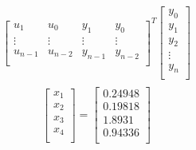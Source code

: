 \documentclass[12pt,letterpaper, onecolumn]{exam}
\begin{document}
\begin{questions}
\begin{parts}
\begin{subparts}
{\begin{equation}
\begin{split}
\begin{bmatrix}
                            u_{1}   & u_{0}   & y_{1}   & y_{0}   \\
                            \vdots  & \vdots  & \vdots  & \vdots  \\
                            u_{n-1} & u_{n-2} & y_{n-1} & y_{n-2} \\
                        \end{bmatrix}^T \begin{bmatrix}
                            y_0    \\
                            y_1    \\
                            y_2    \\
                            \vdots \\
                            y_n    \\
                        \end{bmatrix}\\
                    \end{split}
                    \label{}
                \end{equation}
                \begin{equation}
                    \begin{bmatrix}
                        x_1 \\
                        x_2 \\
                        x_3 \\
                        x_4 \\
                    \end{bmatrix}  =
                    \begin{bmatrix}
                        0.24948 \\
                        0.19818 \\
                        1.8931  \\
                        0.94336 \\
                    \end{bmatrix}
                \end{equation}
            }
            \clearpage


\end{subparts}
\end{parts}
\end{questions}
\end{document}
